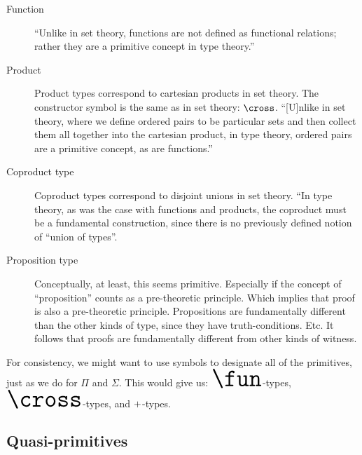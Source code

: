\begin{description}
\item [Function] ``Unlike in set theory, functions are not defined as
  functional relations; rather they are a primitive concept in type
  theory.'' \citep[p. 21]{hottbook}

\item [Product] Product types correspond to cartesian products in set
  theory.  The constructor symbol is the same as in set theory:
  \(\cross\).
  ``[U]nlike in set theory, where we define ordered pairs to be
  particular sets and then collect them all together into the
  cartesian product, in type theory, ordered pairs are a primitive
  concept, as are functions.''\citep[p. 26]{hottbook}

\item [Coproduct type] Coproduct types correspond to disjoint unions
  in set theory.  ``In type theory, as was the case with functions and
  products, the coproduct must be a fundamental construction, since
  there is no previously defined notion of ``union of
  types''.\citep[p. 33]{hottbook}

\item [Proposition type] Conceptually, at least, this seems primitive.
  Especially if the concept of ``proposition'' counts as a
  pre-theoretic principle.  Which implies that proof is also a
  pre-theoretic principle.  Propositions are fundamentally different
  than the other kinds of type, since they have truth-conditions. Etc.
  It follows that proofs are fundamentally different from other kinds
  of witness.

\end{description}

\begin{remark}
  For consistency, we might want to use symbols to designate all of
  the primitives, just as we do for \(\Pi\) and \(\Sigma\).  This
  would give us: \(\Huge\fun\)-types, \(\Huge\cross\)-types, and
  \(\Huge +\)-types.
\end{remark}


\subsection{\HoTT Quasi-primitives}
\label{subs:quasiprim}

